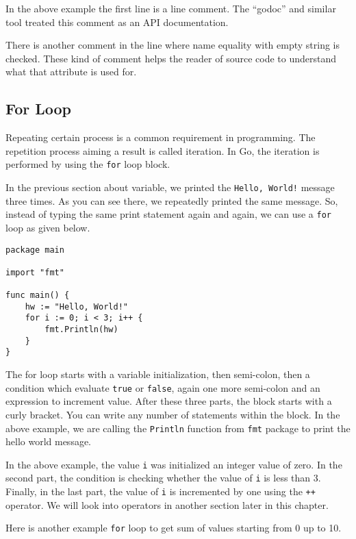 In the above example the first line is a line comment.  The ``godoc''
and similar tool treated this comment as an API documentation.

There is another comment in the line where name equality with empty
string is checked.  These kind of comment helps the reader of
source code to understand what that attribute is used for.

\subsection{For Loop}

Repeating certain process is a common requirement in programming.  The
repetition process aiming a result is called iteration.  In Go, the
iteration is performed by using the \texttt{for} loop
block.

In the previous section about variable, we printed the \texttt{Hello,
World!}  message three times.  As you can see there, we repeatedly
printed the same message.  So, instead of typing the same print
statement again and again, we can use a \texttt{for} loop as given
below.

\begin{lstlisting}[caption=For loop (sum1.go)]
package main

import "fmt"

func main() {
    hw := "Hello, World!"
    for i := 0; i < 3; i++ {
        fmt.Println(hw)
    }
}
\end{lstlisting}

The for loop starts with a variable initialization, then semi-colon,
then a condition which evaluate \texttt{true} or \texttt{false}, again
one more semi-colon and an expression to increment value.  After these
three parts, the block starts with a curly bracket.  You can write any
number of statements within the block.  In the above example, we are
calling the \texttt{Println} function from \texttt{fmt} package to
print the hello world message.

In the above example, the value \texttt{i} was initialized an integer
value of zero.  In the second part, the condition is checking whether
the value of \texttt{i} is less than 3.  Finally, in the last part,
the value of \texttt{i} is incremented by one using the \texttt{++}
operator.  We will look into operators in another section later in
this chapter.

Here is another example \texttt{for} loop to get sum of values
starting from 0 up to 10.

